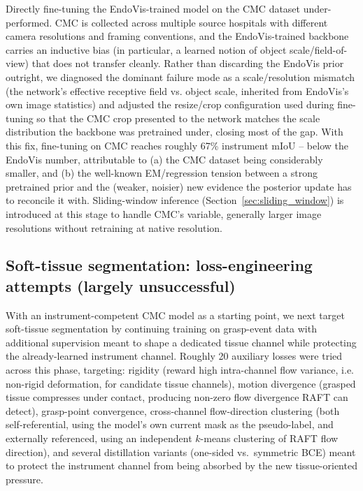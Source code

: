 \documentclass[conference]{IEEEtran}
\begin{document}
Directly fine-tuning the EndoVis-trained model on the CMC dataset
under-performed. CMC is collected across multiple source hospitals with
different camera resolutions and framing conventions, and the
EndoVis-trained backbone carries an inductive bias (in particular, a
learned notion of object scale/field-of-view) that does not transfer
cleanly. Rather than discarding the EndoVis prior outright, we diagnosed
the dominant failure mode as a scale/resolution mismatch (the network's
effective receptive field vs. object scale, inherited from EndoVis's own
image statistics) and adjusted the resize/crop configuration used during
fine-tuning so that the CMC crop presented to the network matches the
scale distribution the backbone was pretrained under, closing most of the
gap. With this fix, fine-tuning on CMC reaches roughly 67\% instrument
mIoU -- below the EndoVis number, attributable to (a) the CMC dataset
being considerably smaller, and (b) the well-known EM/regression tension
between a strong pretrained prior and the (weaker, noisier) new evidence
the posterior update has to reconcile it with. Sliding-window inference
(Section~\ref{sec:sliding_window}) is introduced at this stage to handle
CMC's variable, generally larger image resolutions without retraining at
native resolution.

\subsection{Soft-tissue segmentation: loss-engineering attempts (largely unsuccessful)}
\label{sec:tissue_loss}

With an instrument-competent CMC model as a starting point, we next
target soft-tissue segmentation by continuing training on grasp-event
data with additional supervision meant to shape a dedicated tissue
channel while protecting the already-learned instrument channel. Roughly
20 auxiliary losses were tried across this phase, targeting: rigidity
(reward high intra-channel flow variance, i.e. non-rigid deformation, for
candidate tissue channels), motion divergence (grasped tissue compresses
under contact, producing non-zero flow divergence RAFT can detect),
grasp-point convergence, cross-channel flow-direction clustering (both
self-referential, using the model's own current mask as the pseudo-label,
and externally referenced, using an independent $k$-means clustering of
RAFT flow direction), and several distillation variants (one-sided vs.\
symmetric BCE) meant to protect the instrument channel from being
absorbed by the new tissue-oriented pressure.
\end{document}

